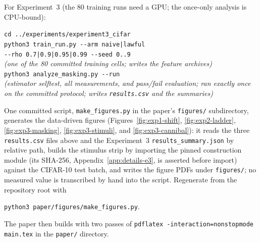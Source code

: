 \documentclass[twocolumn,10pt]{article}
\theoremstyle{definition}
\theoremstyle{remark}
\begin{document}
For Experiment~3 (the 80 training runs need a GPU; the once-only
analysis is CPU-bound):
\begin{flushleft}\footnotesize
\texttt{cd ../experiments/experiment3\_cifar}\\
\texttt{python3 train\_run.py -{}-arm naive|lawful}\\
\texttt{\hspace*{1.5em}-{}-rho 0.7|0.9|0.95|0.99 -{}-seed 0..9}\\
{\itshape \hspace*{1.5em}(one of the 80 committed training cells;
writes the feature archives)}\\
\texttt{python3 analyze\_masking.py -{}-run}\\
{\itshape \hspace*{1.5em}(estimator selftest, all measurements, and
pass/fail evaluation; ran exactly once on the committed protocol;
writes \textup{\texttt{results.csv}} and the summaries)}
\end{flushleft}
One committed script, \texttt{make\_figures.py} in the paper's
\texttt{figures/} subdirectory, generates the data-driven figures
(Figures~\ref{fig:exp1-shift}, \ref{fig:exp2-ladder},
\ref{fig:exp3-masking}, \ref{fig:exp3-stimuli}, and
\ref{fig:exp3-cannibal}): it reads
the three \texttt{results.csv} files above and the Experiment~3
\texttt{results\_summary.json} by relative path, builds the stimulus
strip by importing the pinned construction module (its SHA-256,
Appendix~\ref{app:details-e3}, is asserted before import) against the
CIFAR-10 test batch, and writes
the figure PDFs under \texttt{figures/}; no measured value is transcribed
by hand into the script. Regenerate from the repository root with
\begin{center}
\texttt{python3 paper/figures/make\_figures.py}.
\end{center}
The paper then builds with two
passes of \texttt{pdflatex -interaction=nonstopmode main.tex} in the
\texttt{paper/} directory.
\end{document}
